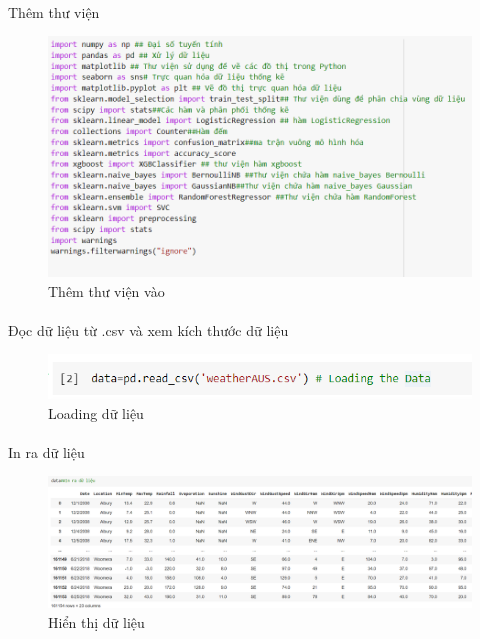 \documentclass{article}
\begin{document}
\paragraph{} Thêm thư viện
\begin{figure}[!h]
	\begin{center}
		\includegraphics[width=\linewidth]{images/thuvien.png}
		\caption{\fontsize{14}{20}\selectfont Thêm thư viện vào}
	\end{center}
\end{figure}

\paragraph{}Đọc dữ liệu từ .csv và xem kích thước dữ liệu
\begin{figure}[!h]
	\begin{center}
		\includegraphics[width=\linewidth]{images/code2.png}
		\caption{\fontsize{14}{20}\selectfont Loading dữ liệu}
	\end{center}
\end{figure}

\paragraph{}In ra dữ liệu
\begin{figure}[!h]
	\begin{center}
		\includegraphics[width=\linewidth]{images/code3.png}
		\caption{\fontsize{14}{20}\selectfont Hiển thị dữ liệu}
	\end{center}
\end{figure}
\end{document}
